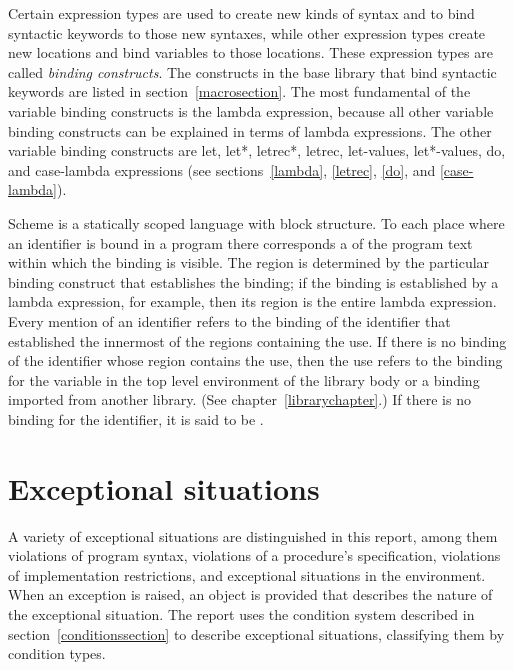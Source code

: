 

\vest Certain expression types are used to create new kinds of syntax
and to bind syntactic keywords to those new syntaxes, while other
expression types create new locations and bind variables to those
locations.  These expression types are called {\em binding constructs}.
The constructs in the base library that bind syntactic keywords are listed in section~\ref{macrosection}.
The most fundamental of the variable binding constructs is the
{\cf lambda} expression, because all other variable binding constructs
can be explained in terms of {\cf lambda} expressions.  The other
variable binding constructs are {\cf let}, {\cf let*}, {\cf letrec*},
{\cf letrec}, {\cf let-values}, {\cf let*-values}, {\cf do}, and {\cf
  case-lambda} expressions (see sections~\ref{lambda}, \ref{letrec}, 
\ref{do}, and \ref{case-lambda}).


\vest Scheme is a statically scoped language with
block structure.  To each place where an identifier is bound in a program
there corresponds a  of the program text within which
the binding is visible.  The region is determined by the particular
binding construct that establishes the binding; if the binding is
established by a {\cf lambda} expression, for example, then its region
is the entire {\cf lambda} expression.  Every mention of an identifier
refers to the binding of the identifier that established the
innermost of the regions containing the use.  If there is no binding of
the identifier whose region contains the use, then the use refers to the
binding for the variable in the top level environment of the library
body or a binding imported from another library.  (See
chapter~\ref{librarychapter}.)
If there is no binding for the identifier,
it is said to be .

\section{Exceptional situations}
\label{exceptionalsituationsection}

A variety of exceptional situations
are distinguished in this report, among them violations of program
syntax, violations of a procedure's specification, violations of
implementation restrictions, and exceptional situations in the
environment.  When an exception is raised, an object is provided that
describes the nature of the exceptional situation.  The report uses
the condition system described in section~\ref{conditionssection} to
describe exceptional situations, classifying them by condition types.


